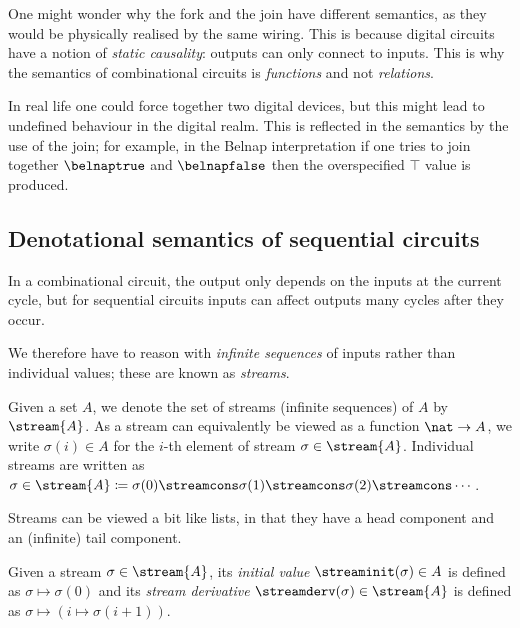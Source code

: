 \documentclass{lmcs}
\begin{document}
\begin{rem}
    One might wonder why the fork and the join have different semantics, as they
    would be physically realised by the same wiring.
    This is because digital circuits have a notion of \emph{static causality}:
    outputs can only connect to inputs.
    This is why the semantics of combinational circuits is \emph{functions} and
    not \emph{relations}.

    In real life one could force together two digital devices, but this might
    lead to undefined behaviour in the digital realm.
    This is reflected in the semantics by the use of the join; for example, in
    the Belnap interpretation if one tries to join together \(\belnaptrue\) and
    \(\belnapfalse\) then the overspecified \(\top\) value is produced.
\end{rem}

\subsection{Denotational semantics of sequential circuits}

In a combinational circuit, the output only depends on the inputs at the current
cycle, but for sequential circuits inputs can affect outputs many cycles after
they occur.

We therefore have to reason with \emph{infinite sequences} of inputs rather than
individual values; these are known as \emph{streams}.

\begin{nota}
    Given a set \(A\), we denote the set of streams (infinite sequences) of
    \(A\) by \(\stream{A}\).
    As a stream can equivalently be viewed as a function \(\nat \to A\), we
    write \(\sigma(i) \in A\) for the \(i\)-th element of stream
    \(\sigma \in \stream{A}\).
    Individual streams are written as \(
    \sigma \in \stream{A}
    \coloneqq
    \sigma(0) \streamcons \sigma(1) \streamcons
    \sigma(2) \streamcons \cdots
    \).
\end{nota}

Streams can be viewed a bit like lists, in that they have a head component and
an (infinite) tail component.

\begin{defi}\label{def:stream-operations}
    Given a stream \(\sigma \in \stream{A}\), its \emph{initial value}
    \(\streaminit(\sigma) \in A\) is defined as \(\sigma \mapsto \sigma(0)\)
    and its \emph{stream derivative} \(\streamderv(\sigma) \in \stream{A}\) is
    defined as \(\sigma \mapsto (i \mapsto \sigma(i+1))\).
\end{defi}
\end{document}
